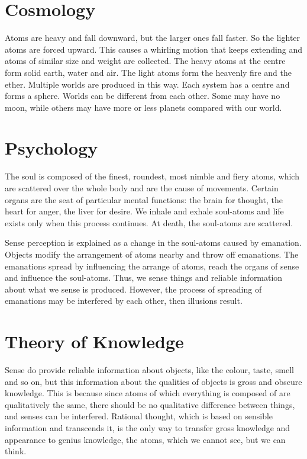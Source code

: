 \documentclass[11pt]{article}
\begin{document}
\begin{sloppypar}
\section{Cosmology}
Atoms are heavy and fall downward, but the larger ones fall faster. 
So the lighter atoms are forced upward. 
This causes a whirling motion that keeps extending and atoms of similar size and weight are collected. 
The heavy atoms at the centre form solid earth, water and air. 
The light atoms form the heavenly fire and the ether. 
Multiple worlds are produced in this way. 
Each system has a centre and forms a sphere. 
Worlds can be different from each other. 
Some may have no moon, while others may have more or less planets compared with our world. 
  
\section{Psychology}
The soul is composed of the finest, roundest, most nimble and fiery atoms, which are scattered over the whole body and are the cause of movements. 
Certain organs are the seat of particular mental functions: 
the brain for thought, the heart for anger, the liver for desire. 
We inhale and exhale soul-atoms and life exists only when this process continues. 
At death, the soul-atoms are scattered.

\par

Sense perception is explained as a change in the soul-atoms caused by emanation. 
Objects modify the arrangement of atoms nearby and throw off emanations. 
The emanations spread by influencing the arrange of atoms, reach the organs of sense and influence the soul-atoms. 
Thus, we sense things and reliable information about what we sense is produced. 
However, the process of spreading of emanations may be interfered by each other, then illusions result.
  
\section{Theory of Knowledge}
Sense do provide reliable information about objects, like the colour, taste, smell and so on, but this information about the qualities of objects is gross and obscure knowledge. 
This is because since atoms of which everything is composed of are qualitatively the same, there should be no qualitative difference between things, and senses can be interfered. 
Rational thought, which is based on sensible information and transcends it, is the only way to transfer gross knowledge and appearance to genius knowledge, the atoms, which we cannot see, but we can think. 
  

\end{sloppypar}
\end{document}
